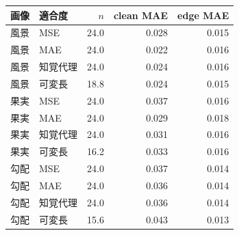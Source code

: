 \begin{tabular}{llrrr}
\toprule
画像 & 適合度 & $n$ & clean MAE & edge MAE \\
\midrule
風景 & MSE & 24.0 & 0.028 & 0.015 \\
風景 & MAE & 24.0 & 0.022 & 0.016 \\
風景 & 知覚代理 & 24.0 & 0.024 & 0.016 \\
風景 & 可変長 & 18.8 & 0.024 & 0.015 \\
\midrule
果実 & MSE & 24.0 & 0.037 & 0.016 \\
果実 & MAE & 24.0 & 0.029 & 0.018 \\
果実 & 知覚代理 & 24.0 & 0.031 & 0.016 \\
果実 & 可変長 & 16.2 & 0.033 & 0.016 \\
\midrule
勾配 & MSE & 24.0 & 0.037 & 0.014 \\
勾配 & MAE & 24.0 & 0.036 & 0.014 \\
勾配 & 知覚代理 & 24.0 & 0.036 & 0.014 \\
勾配 & 可変長 & 15.6 & 0.043 & 0.013 \\
\bottomrule
\end{tabular}
